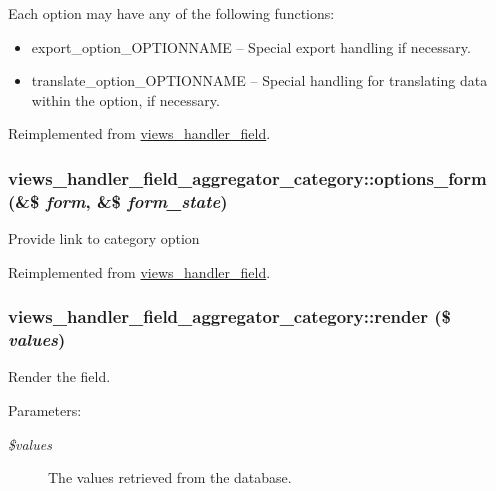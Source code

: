  Each option may have any of the following functions:\begin{itemize}
\item export\_\-option\_\-OPTIONNAME -- Special export handling if necessary.\item translate\_\-option\_\-OPTIONNAME -- Special handling for translating data within the option, if necessary. \end{itemize}


Reimplemented from \hyperlink{classviews__handler__field_64c69a8a3697603f8283405071c25b76}{views\_\-handler\_\-field}.\hypertarget{classviews__handler__field__aggregator__category_43be8cbc1313b8b3f51321490d40a914}{
\subsubsection[{options\_\-form}]{\setlength{\rightskip}{0pt plus 5cm}views\_\-handler\_\-field\_\-aggregator\_\-category::options\_\-form (\&\$ {\em form}, \/  \&\$ {\em form\_\-state})}}
\label{classviews__handler__field__aggregator__category_43be8cbc1313b8b3f51321490d40a914}


Provide link to category option 

Reimplemented from \hyperlink{classviews__handler__field_0435d161922b7b4b84f02a2e79bb947a}{views\_\-handler\_\-field}.\hypertarget{classviews__handler__field__aggregator__category_7e4b0ebcef6f6f5b37480eb15eb378f0}{
\subsubsection[{render}]{\setlength{\rightskip}{0pt plus 5cm}views\_\-handler\_\-field\_\-aggregator\_\-category::render (\$ {\em values})}}
\label{classviews__handler__field__aggregator__category_7e4b0ebcef6f6f5b37480eb15eb378f0}


Render the field.

\begin{Desc}
\item[Parameters:]
\begin{description}
\item[{\em \$values}]The values retrieved from the database. \end{description}
\end{Desc}


